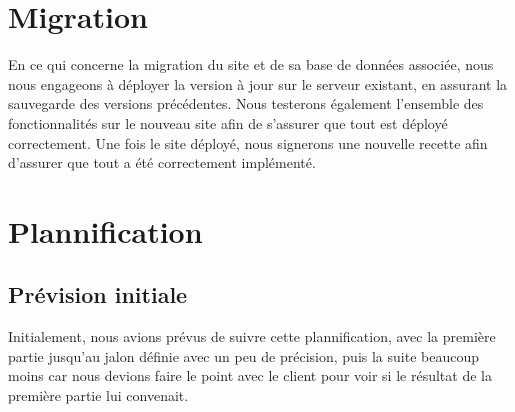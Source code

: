 \documentclass[11pt]{report}
\begin{document}
\section{Migration}
 En ce qui concerne la migration du site et de sa base de données associée, nous
 nous engageons à déployer la version à jour sur le serveur existant, en
 assurant la sauvegarde des versions précédentes. Nous testerons également
 l'ensemble des fonctionnalités sur le nouveau site afin de s'assurer que tout
 est déployé correctement.
 Une fois le site déployé, nous signerons une nouvelle recette afin d'assurer
que tout a été correctement implémenté.

\newpage
\section{Plannification}
\subsection{Prévision initiale}
Initialement, nous avions prévus de suivre cette plannification, avec la
première partie jusqu'au jalon définie avec un peu de précision, puis la suite
beaucoup moins car nous devions faire le point avec le client pour voir si le
résultat de la première partie lui convenait.
\par

 \begin{landscape}
   
\end{landscape}
\clearpage
\end{document}
